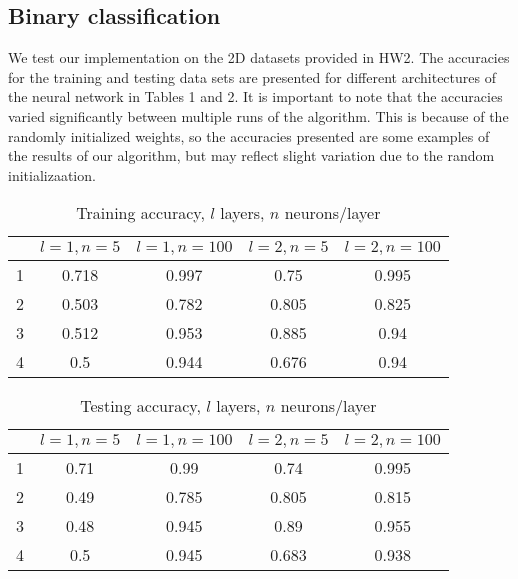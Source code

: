 \documentclass{article}
\begin{document}
\subsection{Binary classification}
We test our implementation on the 2D datasets provided in HW2. The accuracies for the training and testing data sets are presented for different architectures of the neural network in Tables 1 and 2. It is important to note that the accuracies varied significantly between multiple runs of the algorithm. This is because of the randomly initialized weights, so the accuracies presented are some examples of the results of our algorithm, but may reflect slight variation due to the random initializaation.

\begin{table}
  \begin{center}
    \begin{tabular}{ | c | c | c | c | c | }
      \hline
          & $l=1, n=5$ & $l=1, n=100$ & $l=2, n=5$ & $l=2, n=100$ \\ \hline
      1       & 0.718      & 0.997        & 0.75       & 0.995        \\ \hline
      2       & 0.503      & 0.782        & 0.805      & 0.825        \\ \hline
      3       & 0.512      & 0.953        & 0.885      & 0.94         \\ \hline
      4       & 0.5        & 0.944        & 0.676      & 0.94         \\ \hline
    \end{tabular}
  \end{center}
  \caption{Training accuracy, $l$ layers, $n$ neurons/layer}
\end{table}

\begin{table}
  \begin{center}
    \begin{tabular}{ | c | c | c | c | c | }
      \hline
          & $l=1, n=5$ & $l=1, n=100$ & $l=2, n=5$ & $l=2, n=100$ \\ \hline
      1       & 0.71       & 0.99         & 0.74       & 0.995        \\ \hline
      2       & 0.49       & 0.785        & 0.805      & 0.815        \\ \hline
      3       & 0.48       & 0.945        & 0.89       & 0.955        \\ \hline
      4       & 0.5        & 0.945        & 0.683      & 0.938 \\ \hline
    \end{tabular}
  \end{center}
  \caption{Testing accuracy, $l$ layers, $n$ neurons/layer}
\end{table}
\end{document}
